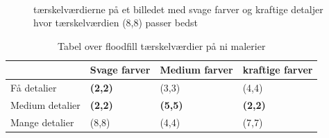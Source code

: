 \begin{figure}[!h]
    \centering
    \\
    \caption[]{tærskelværdierne på et billedet med svage farver og kraftige detaljer hvor tærskelværdien (8,8) passer bedst}
    \label{Floodfillbilledet}
\end{figure}

\begin{table}[!h]
    \centering
    \begin{tabular}{| l | l | l | l |} \hline
        & Svage farver 		& Medium farver & kraftige farver \\ \hline
        Få detalier 		& \textbf{(2,2)}	& (3,3)			& (4,4)\\ \hline
        Medium detalier 	& \textbf{(2,2)}	& \textbf{(5,5)}& \textbf{(2,2)}\\ \hline
        Mange detalier		& (8,8)				& (4,4)			& (7,7)\\ \hline
    \end{tabular}
    \caption{Tabel over floodfill tærskelværdier på ni malerier}
    \label{thressholdsTabelFF}
\end{table}

